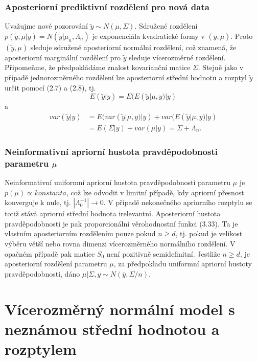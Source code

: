 \subsubsection{Aposteriorní prediktivní rozdělení pro nová data}

Uvažujme nové pozorování $\tilde{y} \sim N(\mu, \Sigma)$. Sdružené rozdělení $p(\tilde{y}, \mu | y) = N(\tilde{y} | \mu_n, \Lambda_n)$ je exponenciála kvadratické formy v $(\tilde{y}, \mu)$. Proto $(\tilde{y}, \mu)$ sleduje sdružené aposteriorní normální rozdělení, což znamená, že aposteriorní marginální rozdělení pro $\tilde{y}$ sleduje vícerozměrné rozdělení. Připomeňme, že předpokládáme znalost kovarianční matice $\Sigma$. Stejně jako v případě jednorozměrného rozdělení lze aposteriorní střední hodnotu a rozptyl $\tilde{y}$ určit pomocí (2.7) a (2.8), tj.
\begin{equation}
E(\tilde{y} | y) = E(E(\tilde{y} | \mu, y) | y)
\end{equation}
a
\begin{equation}
\begin{split}
var(\tilde{y} | y) & = E(var(\tilde{y} | \mu, y) | y) + var(E(\tilde{y} | \mu, y) | y)\\
 & = E(\Sigma | y) + var(\mu | y) = \Sigma + \Lambda_n.
\end{split}
\end{equation}

\subsubsection{Neinformativní apriorní hustota pravděpodobnosti parametru $\mu$}

Neinformativní uniformní apriorní hustota pravděpodobnosti parametru $\mu$ je $p(\mu) \varpropto \textit{konstanta}$, což lze odvodit v limitní případě, kdy apriorní přesnost konverguje k nule, tj. $|\Lambda_0^{-1}| \rightarrow 0$. V případě nekonečného apriorního rozptylu se totiž stává apriorní střední hodnota irelevantní. Aposteriorní hustota pravděpodobnosti je pak proporcionální věrohodnostní funkci (3.33). Ta je vlastním aposteriorním rozdělením pouze pokud $n \ge d$, tj. pokud je velikost výběru větší nebo rovna dimenzi vícerozměrného normálního rozdělení. V opačném případě pak matice $S_0$ není pozitivně semidefinitní. Jestliže $n \ge d$, je aposteriorní rozdělení parametru $\mu$, za předpokladu uniformní apriorní hustoty pravděpodobnosti, dáno $\mu | \Sigma, y \sim N(\overline{y}, \Sigma / n)$.

\section{Vícerozměrný normální model s neznámou střední hodnotou a rozptylem}

